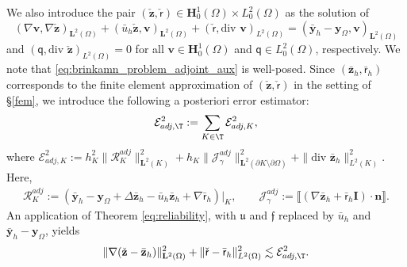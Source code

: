\documentclass[final]{siamart0216}
\begin{document}
We also introduce the pair $(\check{\mathbf{z}},\check{\mathsf{r}})\in\mathbf{H}_0^1(\Omega)\times L_0^2(\Omega)$ as the solution of
\begin{equation}
\label{eq:brinkamn_problem_adjoint_aux}
(\nabla \mathbf{v},\nabla \check{\mathbf{z}})_{\mathbf{L}^2(\Omega)}+( \bar{u}_{h}\check{\mathbf{z}}, \mathbf{v})_{\mathbf{L}^2(\Omega)}+(\check{\mathsf{r}},\text{div }\mathbf{v})_{L^2(\Omega)} = 	(\bar{\mathbf{y}}_{h}-\mathbf{y}_{\Omega},\mathbf{v})_{\mathbf{L}^2(\Omega)}
\end{equation}
and $(\mathsf{q},\text{div }\check{\mathbf{z}})_{L^2(\Omega)}  = 0$ for all $\mathbf{v} \in  \mathbf{H}_0^1(\Omega)$ and $\mathsf{q} \in L_0^2(\Omega)$, respectively. We note that \eqref{eq:brinkamn_problem_adjoint_aux} is well-posed. Since $(\bar{\mathbf{z}}_{h},\bar{\mathsf{r}}_{h})$ corresponds to the finite element approximation of $(\check{\mathbf{z}},\check{\mathsf{r}})$ in the setting of \S \ref{fem}, we introduce the following a posteriori error estimator:
\begin{equation}
\label{eq:estimator_AD}
\mathcal{E}_{adj,\T}^2:= \sum_{K\in\T}\mathcal{E}_{adj,K}^2, 
\end{equation}
where $\mathcal{E}_{adj,K}^2:=h_K^2  \|\mathcal{R}_{K}^{adj}\|_{\mathbf{L}^2(K)}^2+h_K  \|\mathcal{J}_{\gamma}^{adj}\|_{\mathbf{L}^2(\partial K\setminus\partial \Omega)}^2 + \|\text{div }\bar{\mathbf{z}}_{h}\|_{L^2(K)}^2$. Here,
\begin{align}\label{eq:residual_adjoint}
\mathcal{R}_{K}^{adj} := (\bar{\mathbf{y}}_{h}-\mathbf{y}_{\Omega}+\Delta \bar{\mathbf{z}}_{h}\!-\bar{u}_{h}\bar{\mathbf{z}}_{h} + \nabla\bar{\mathsf{r}}_{h})|_K,\qquad 
\mathcal{J}_{\gamma}^{adj} := \llbracket(\nabla \bar{\mathbf{z}}_{h}+\bar{\mathsf{r}}_{h}\mathbf{I})\cdot \mathbf{n}\rrbracket.
\end{align}
An application of Theorem \ref{eq:reliability}, with $\mathfrak{u}$ and $\boldsymbol{\mathfrak{f}}$ replaced by $\bar{u}_{h}$ and $\bar{\mathbf{y}}_{h}-\mathbf{y}_{\Omega}$, yields
\begin{eqnarray}\label{eq:bound_realiability_2}
\|\nabla(\check{\mathbf{z}}-\bar{\mathbf{z}}_{h})\|_{\mathbf{L}^2(\Omega)}^2+\|\check{\mathsf{r}}-\bar{\mathsf{r}}_{h}\|_{L^2(\Omega)}^2\lesssim \mathcal{E}_{adj,\T}^2.
\end{eqnarray}
\end{document}
